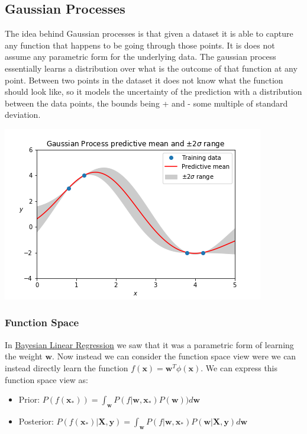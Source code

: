 \documentclass[12pt]{article}
\begin{document}
    \subsection{Gaussian Processes} \label{sec:GaussianProcesses}
        The idea behind Gaussian processes is that given a dataset it is able to capture any function that happens to be
        going through those points. It is does not assume any parametric form for the underlying data. The gaussian
        process essentially learns a distribution over what is the outcome of that function at any point. Between two
        points in the dataset it does not know what the function should look like, so it models the uncertainty of the
        prediction with a distribution between the data points, the bounds being + and - some multiple of standard deviation.
        \begin{center}
            \includegraphics{gaussian_process}
        \end{center}

        \subsubsection{Function Space}
            In \hyperref[sec:BayesianLinearRegression]{Bayesian Linear Regression} we saw that it was a parametric form
            of learning the weight $\boldsymbol{w}$. Now instead we can consider the function space view were we can
            instead directly learn the function $f(\boldsymbol{x}) = \boldsymbol{w}^T\phi(\boldsymbol{x})$. We can
            express this function space view as:

            \begin{itemize}
                \item Prior: $P(f(\boldsymbol{x}_*)) = \int_{\boldsymbol{w}} P(f|\boldsymbol{w}, \boldsymbol{x}_*) P(\boldsymbol{w}))d\boldsymbol{w}$
                \item Posterior: $P(f(\boldsymbol{x}_*)|\boldsymbol{X}, \boldsymbol{y}) = \int_{\boldsymbol{w}}
                P(f|\boldsymbol{w}, \boldsymbol{x}_*) P(\boldsymbol{w}|\boldsymbol{X}, \boldsymbol{y})d\boldsymbol{w}$
            \end{itemize}
\end{document}
